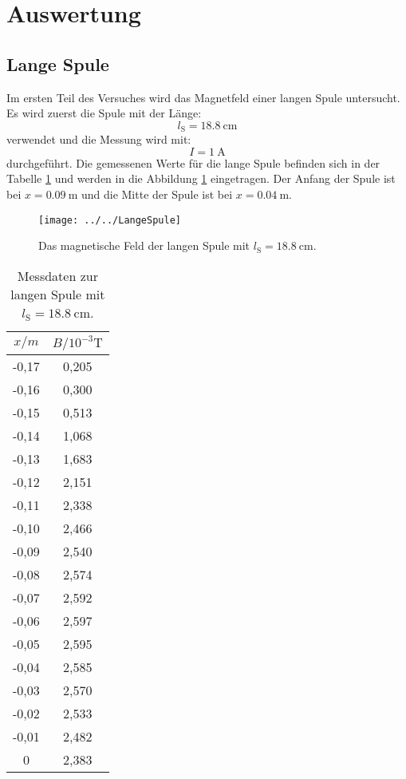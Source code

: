 \section{Auswertung}
\label{sec:Auswertung}

\subsection{Lange Spule}
Im ersten Teil des Versuches wird das Magnetfeld einer langen Spule untersucht. Es wird zuerst die Spule mit der Länge:
\begin{equation*}
l_{\text{S}} = \SI{18,8}{\cm}
\end{equation*}
verwendet und die Messung wird mit:
\begin{equation*}
I = \SI{1}{\ampere}
\end{equation*}
durchgeführt. Die gemessenen Werte für die lange Spule befinden sich in der Tabelle \ref{tab:LangeSpule} und werden in die Abbildung \ref{fig:langespule} eingetragen. Der Anfang der Spule ist bei $x = \SI{0.09}{\meter}$ und die Mitte der Spule ist bei $x = \SI{0.04}{\meter}$. 
\begin{figure}[h!]
	\centering
	\texttt{[image: ../../LangeSpule]}
	\caption{Das magnetische Feld der langen Spule mit $l_{\text{S}} = \SI{18,8}{\cm}$.}
	\label{fig:langespule}
\end{figure}
\begin{table}[htbp]
	\centering
	\caption{Messdaten zur langen Spule mit $l_{\text{S}} = \SI{18,8}{\cm}$.}
	\label{tab:LangeSpule}
	\begin{tabular}{c c}
		\toprule
		$x / \si{m} $ & $ B / 10^{-3} \si{\tesla}$ \\
		\midrule
		-0,17 & 0,205 \\
		-0,16 & 0,300  \\
		-0,15 & 0,513 \\
		-0,14 & 1,068 \\
		-0,13 & 1,683 \\
		-0,12 & 2,151 \\
		-0,11 & 2,338 \\
		-0,10 & 2,466 \\
		-0,09 & 2,540 \\
		-0,08 & 2,574 \\
		-0,07 & 2,592 \\
		-0,06 & 2,597 \\
		-0,05 & 2,595 \\
		-0,04 & 2,585 \\
		-0,03 & 2,570 \\
		-0,02 & 2,533 \\
		-0,01 & 2,482 \\
	    0 & 2,383 \\
		\bottomrule
	\end{tabular}
\end{table}
